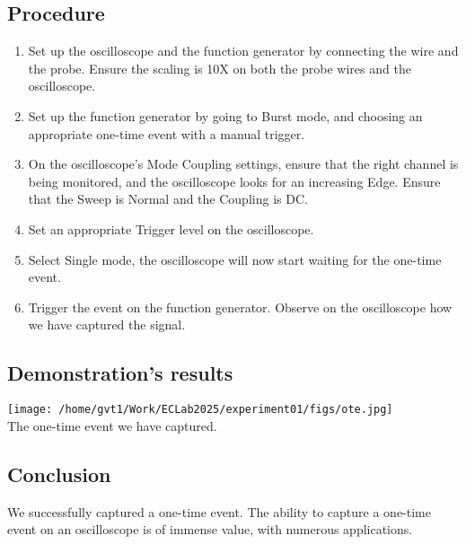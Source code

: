 \documentclass[a4paper,12pt]{article}
\begin{document}
\subsection{Procedure}
\begin{enumerate}
	\item Set up the oscilloscope and the function generator by connecting the wire and the probe. Ensure the scaling is 10X on both the probe wires and the oscilloscope.
	\item Set up the function generator by going to Burst mode, and choosing an appropriate one-time event with a manual trigger.
	\item On the oscilloscope's Mode Coupling settings, ensure that the right channel is being monitored, and the oscilloscope looks for an increasing Edge. Ensure that the Sweep is Normal and the Coupling is DC.
	\item Set an appropriate Trigger level on the oscilloscope.
	\item Select Single mode, the oscilloscope will now start waiting for the one-time event.
	\item Trigger the event on the function generator. Observe on the oscilloscope how we have captured the signal.
\end{enumerate}
\subsection{Demonstration's results}
		\begin{center}
			\texttt{[image: /home/gvt1/Work/ECLab2025/experiment01/figs/ote.jpg]}\\
			The one-time event we have captured.
		\end{center}
\subsection{Conclusion}
We successfully captured a one-time event. The ability to capture a one-time event on an oscilloscope is of immense value, with numerous applications.
\end{document}
